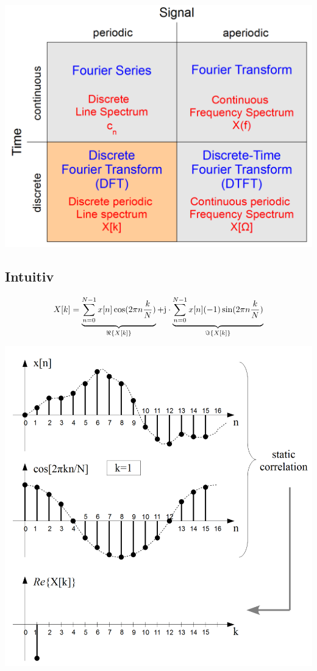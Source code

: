 \begin{center}
	\includegraphics[scale=.7]{./images/fft_methods}
\end{center}

\subsection{Intuitiv}
\[ X[k]=\underbrace{\sum_{n=0}^{N-1}x[n]\cos(2\pi n\frac{k}{N})}_{\Re\{X[k]\}}
	+ \im \cdot \underbrace{\sum_{n=0}^{N-1}x[n](-1)\sin(2\pi n \frac{k}{N})}_
	{\Im\{X[k]\}} \]

\begin{center}
	\includegraphics[scale=.7]{./images/dft_intuitiv}
\end{center}

